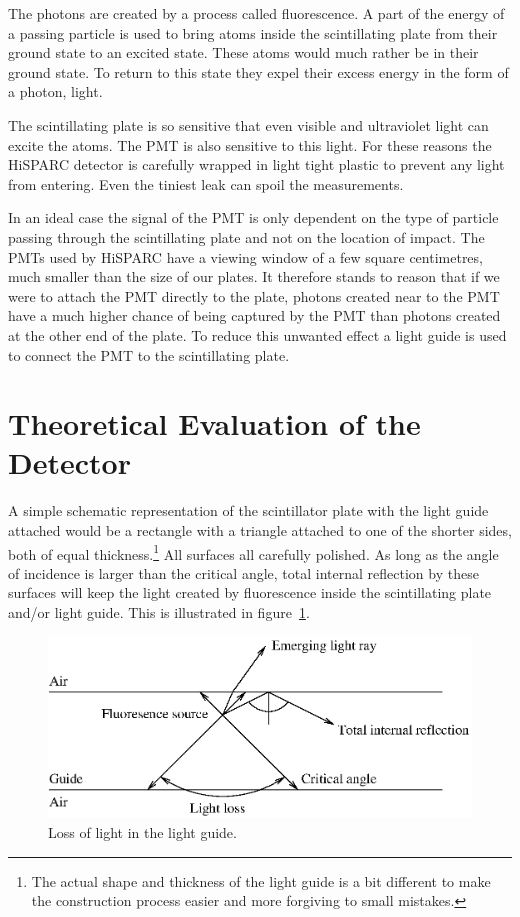 \documentclass[12pt,a4paper]{article}
\numberwithin{equation}{section}
\numberwithin{figure}{section}
\numberwithin{table}{section}
\begin{document}
The photons are created by a process called fluorescence. A part of the energy of a passing particle is used to bring atoms inside the scintillating plate from their ground state to an excited state. These atoms would much rather be in their ground state. To return to this state they expel their excess energy in the form of a photon, light.

The scintillating plate is so sensitive that even visible and ultraviolet light can excite the atoms. The PMT is also sensitive to this light. For these reasons the HiSPARC detector is carefully wrapped in light tight plastic to prevent any light from entering. Even the tiniest leak can spoil the measurements.

In an ideal case the signal of the PMT is only dependent on the type of particle passing through the scintillating plate and not on the location of impact. The PMTs used by HiSPARC have a viewing window of a few square centimetres, much smaller than the size of our plates. It therefore stands to reason that if we were to attach the PMT directly to the plate, photons created near to the PMT have a much higher chance of being captured by the PMT than photons created at the other end of the plate. To reduce this unwanted effect a light guide is used to connect the PMT to the scintillating plate.

\section{Theoretical Evaluation of the Detector}
A simple schematic representation of the scintillator plate with the light guide attached would be a rectangle with a triangle attached to one of the shorter sides, both of equal thickness.\footnote{The actual shape and thickness of the light guide is a bit different to make the construction process easier and more forgiving to small mistakes.} All surfaces all carefully polished. As long as the angle of incidence is larger than the critical angle, total internal reflection by these surfaces will keep the light created by fluorescence inside the scintillating plate and/or light guide. This is illustrated in figure~\ref{fig:light_loss}.

\begin{figure}\begin{center}
\includegraphics[scale=1]{light_loss.eps}%
\caption{Loss of light in the light guide.}\label{fig:light_loss}
\end{center}\end{figure}
\end{document}
